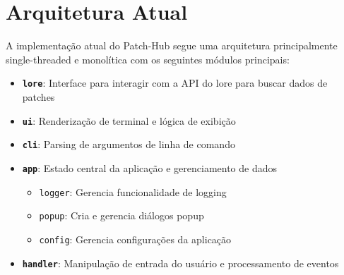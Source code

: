 \section{Arquitetura Atual}

A implementação atual do Patch-Hub segue uma arquitetura principalmente single-threaded e monolítica com os seguintes módulos principais:

\begin{itemize}
    \item \textbf{\texttt{lore}}: Interface para interagir com a API do lore para buscar dados de patches
    \item \textbf{\texttt{ui}}: Renderização de terminal e lógica de exibição
    \item \textbf{\texttt{cli}}: Parsing de argumentos de linha de comando
    \item \textbf{\texttt{app}}: Estado central da aplicação e gerenciamento de dados
    \begin{itemize}
        \item \texttt{logger}: Gerencia funcionalidade de logging
        \item \texttt{popup}: Cria e gerencia diálogos popup
        \item \texttt{config}: Gerencia configurações da aplicação
    \end{itemize}
    \item \textbf{\texttt{handler}}: Manipulação de entrada do usuário e processamento de eventos
\end{itemize}

